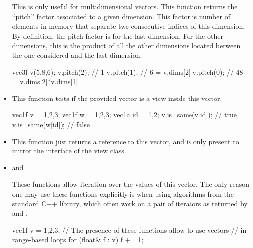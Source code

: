 \documentclass[12pt]{report}
\newenvironment{example}
{
    \begin{mdframed}[style=example,frametitle={Example}]
}
{
    \end{mdframed}
}
\begin{document}
\begin{itemize}
This is only useful for multidimensional vectors. This function returns the ``pitch'' factor associated to a given dimension. This factor is number of elements in memory that separate two consecutive indices of this dimension. By definition, the pitch factor is  for the last dimension. For the other dimensions, this is the product of all the other dimensions located between the one considered and the last dimension.

\begin{example}
\begin{cppcode}
vec3f v(5,8,6);
v.pitch(2); // 1
v.pitch(1); // 6 = v.dims[2]
v.pitch(0); // 48 = v.dims[2]*v.dims[1]
\end{cppcode}
\end{example}

\item {}

This function tests if the provided vector is a view inside this vector.

\begin{example}
\begin{cppcode}
vec1f v = {1,2,3};
vec1f w = {1,2,3};
vec1u id = {1,2};
v.is_same(v[id]); // true
v.is_same(w[id]); // false
\end{cppcode}
\end{example}

\item {}

This function just returns a reference to this vector, and is only present to mirror the interface of the view class.

\item {} and 

These functions allow iteration over the values of this vector. The only reason one may use these functions explicitly is when using algorithms from the standard C++ library, which often work on a pair of iterators as returned by  and .

\begin{example}
\begin{cppcode}
vec1f v = {1,2,3};
// The presence of these functions allow to use vectors
// in range-based loops
for (float& f : v) {
    f += 1;
}
\end{cppcode}
\end{example}
\end{itemize}
\end{document}
